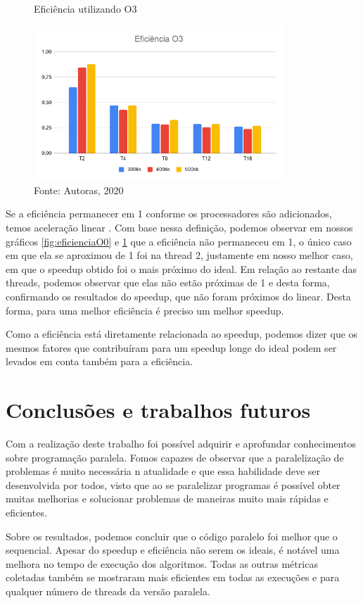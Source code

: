 \documentclass[journal]{IEEEtran}
\begin{document}
\begin{figure}[H]
    \centering
    \caption{Eficiência utilizando O3}
    \includegraphics[width=3.7in]{imagens/EficienciaO3.png}
    \caption*{Fonte: Autoras, 2020}
    \label{fig:eficienciaO3}
\end{figure}

Se a eficiência permanecer em 1 conforme os processadores são adicionados, temos aceleração linear \cite{Eager}. Com base nessa definição, podemos observar em nossos gráficos \ref{fig:eficienciaO0} e \ref{fig:eficienciaO3} que a eficiência não permaneceu em 1, o único caso em que ela se aproximou de 1 foi na thread 2, justamente em nosso melhor caso, em que o speedup obtido foi o mais próximo do ideal. Em relação ao restante das threads, podemos observar que elas não estão próximas de 1 e desta forma, confirmando os resultados do speedup, que não foram próximos do linear. Desta forma, para uma melhor eficiência é preciso um melhor speedup.



Como a eficiência está diretamente relacionada ao speedup, podemos dizer que os mesmos fatores que contribuíram para um speedup longe do ideal podem ser levados em conta também para a eficiência.


\section{Conclusões e trabalhos futuros}
Com a realização deste trabalho foi possível adquirir e aprofundar conhecimentos sobre programação paralela. Fomos capazes de observar que a paralelização de problemas é muito necessária n atualidade e que essa habilidade deve ser desenvolvida por todos, visto que ao se paralelizar programas é possível obter muitas melhorias e solucionar problemas de maneiras muito mais rápidas e eficientes.

Sobre os resultados, podemos concluir que o código paralelo foi melhor que o sequencial. Apesar do speedup e eficiência não serem os ideais, é notável uma melhora no tempo de execução dos algoritmos. Todas as outras métricas coletadas também se mostraram mais eficientes em todas as execuções e para qualquer número de threads da versão paralela.
\end{document}
